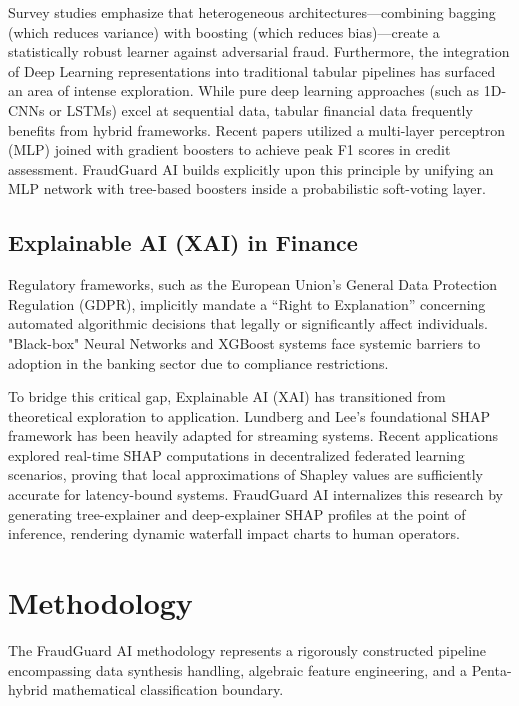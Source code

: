 \documentclass[conference]{IEEEtran}
\begin{document}
Survey studies \cite{nguyen2022deep} emphasize that heterogeneous architectures—combining bagging (which reduces variance) with boosting (which reduces bias)—create a statistically robust learner against adversarial fraud. Furthermore, the integration of Deep Learning representations into traditional tabular pipelines has surfaced an area of intense exploration. While pure deep learning approaches (such as 1D-CNNs or LSTMs) excel at sequential data, tabular financial data frequently benefits from hybrid frameworks. Recent papers \cite{ranjan2024} utilized a multi-layer perceptron (MLP) joined with gradient boosters to achieve peak F1 scores in credit assessment. FraudGuard AI builds explicitly upon this principle by unifying an MLP network with tree-based boosters inside a probabilistic soft-voting layer.

\subsection{Explainable AI (XAI) in Finance}
Regulatory frameworks, such as the European Union's General Data Protection Regulation (GDPR), implicitly mandate a ``Right to Explanation'' concerning automated algorithmic decisions that legally or significantly affect individuals. "Black-box" Neural Networks and XGBoost systems face systemic barriers to adoption in the banking sector due to compliance restrictions.

To bridge this critical gap, Explainable AI (XAI) has transitioned from theoretical exploration to application. Lundberg and Lee's foundational SHAP framework \cite{lundberg2017} has been heavily adapted for streaming systems. Recent applications \cite{hassan2023} explored real-time SHAP computations in decentralized federated learning scenarios, proving that local approximations of Shapley values are sufficiently accurate for latency-bound systems. FraudGuard AI internalizes this research by generating tree-explainer and deep-explainer SHAP profiles at the point of inference, rendering dynamic waterfall impact charts to human operators.


\section{Methodology}
\label{sec:methodology}
The FraudGuard AI methodology represents a rigorously constructed pipeline encompassing data synthesis handling, algebraic feature engineering, and a Penta-hybrid mathematical classification boundary.
\end{document}
